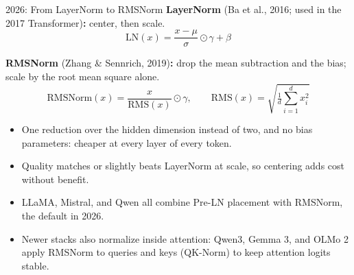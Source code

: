\begin{frame}[allowframebreaks]{2026: From LayerNorm to RMSNorm}
  \textbf{LayerNorm} (Ba et al., 2016; used in the 2017 Transformer)\textbf{:} center, then scale.
  \[
    \mathrm{LN}(x) = \frac{x - \mu}{\sigma} \odot \gamma + \beta
  \]

  \textbf{RMSNorm} (Zhang \& Sennrich, 2019)\textbf{:} drop the mean subtraction and the bias; scale by the root mean square alone.
  \[
    \mathrm{RMSNorm}(x) = \frac{x}{\mathrm{RMS}(x)} \odot \gamma,
    \qquad
    \mathrm{RMS}(x) = \sqrt{\tfrac{1}{d}\textstyle\sum_{i=1}^{d} x_i^2}
  \]
  \framebreak 
  \vspace{0.5em}
  \begin{itemize}
    \item[$\blacktriangleright$] One reduction over the hidden dimension instead of two, and no bias parameters: cheaper at every layer of every token.
    \item[$\blacktriangleright$] Quality matches or slightly beats LayerNorm at scale, so centering adds cost without benefit.
    \item[$\blacktriangleright$] LLaMA, Mistral, and Qwen all combine Pre-LN placement with RMSNorm, the default in 2026.

    \item[$\blacktriangleright$] Newer stacks also normalize inside attention: Qwen3, Gemma 3, and OLMo 2 apply RMSNorm to queries and keys (QK-Norm) to keep attention logits stable.
  \end{itemize}
\end{frame}
